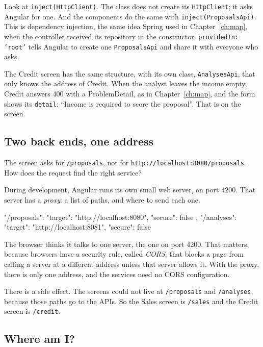 Look at \texttt{inject(HttpClient)}. The class does not create its
\texttt{HttpClient}; it asks Angular for one. And the components do the same
with \texttt{inject(ProposalsApi)}. This is dependency injection, the same
idea Spring used in Chapter~\ref{ch:map}, when the controller received its
repository in the constructor. \texttt{providedIn: 'root'} tells Angular to
create one \texttt{ProposalsApi} and share it with everyone who asks.

The Credit screen has the same structure, with its own class,
\texttt{AnalysesApi}, that only knows the address of Credit. When the
analyst leaves the income empty, Credit answers 400 with a ProblemDetail, as
in Chapter~\ref{ch:map}, and the form shows its \texttt{detail}: ``Income is
required to score the proposal''. That is  on the screen.

\subsection*{Two back ends, one address}

The screen asks for \texttt{/proposals}, not for
\texttt{http://localhost:8080/proposals}. How does the request find the right
service?

During development, Angular runs its own small web server, on port 4200.
That server has a \emph{proxy}: a list of paths, and where to send each one.

\begin{code}[language={}]
{
  "/proposals": {
    "target": "http://localhost:8080",
    "secure": false
  },
  "/analyses": {
    "target": "http://localhost:8081",
    "secure": false
  }
}
\end{code}

The browser thinks it talks to one server, the one on port 4200. That
matters, because browsers have a security rule, called \emph{CORS}, that
blocks a page from calling a server at a different address unless that server
allows it. With the proxy, there is only one address, and the services need
no CORS configuration.

There is a side effect. The screens could not live at \texttt{/proposals}
and \texttt{/analyses}, because those paths go to the APIs. So the Sales
screen is \texttt{/sales} and the Credit screen is \texttt{/credit}.

\subsection*{Where am I?}

